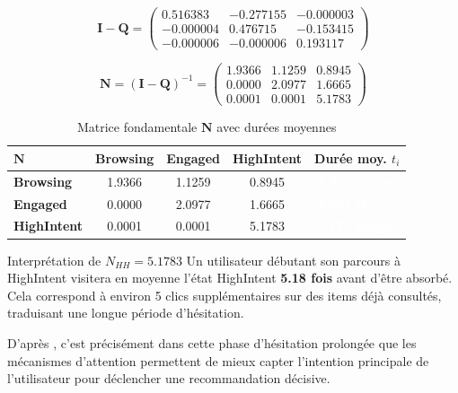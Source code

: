 \documentclass[11pt,a4paper]{article}
\newcommand{\mat}[1]{\mathbf{#1}}
\newcommand{\st}[1]{\textsf{\small#1}}
\begin{document}
\[
  \mat{I}-\mat{Q} =
  \begin{pmatrix}
    0.516383 & -0.277155 & -0.000003 \\
   -0.000004 &  0.476715 & -0.153415 \\
   -0.000006 & -0.000006 &  0.193117
  \end{pmatrix}
\]

\[
  \boxed{
    \mat{N} = (\mat{I}-\mat{Q})^{-1} =
    \begin{pmatrix}
      1.9366 & 1.1259 & 0.8945 \\
      0.0000 & 2.0977 & 1.6665 \\
      0.0001 & 0.0001 & 5.1783
    \end{pmatrix}
  }
\]

\begin{table}[H]
\centering
\caption{Matrice fondamentale $\mat{N}$ avec durées moyennes}
\label{tab:N}
\begin{tabular}{l|ccc|c}
\toprule
\rowcolor{DarkBlue}
\color{white}$\mat{N}$ &
\color{white}Browsing &
\color{white}Engaged &
\color{white}HighIntent &
\color{white}\textbf{Durée moy. $t_i$} \\
\midrule
\rowcolor{LightBlue}
\textbf{Browsing} &
  1.9366 & 1.1259 & 0.8945 &
  \cellcolor{DarkBlue}\textcolor{white}{\bfseries 3.957 étapes} \\
\rowcolor{LightGreen}
\textbf{Engaged} &
  0.0000 & 2.0977 & 1.6665 &
  \cellcolor{DarkBlue}\textcolor{white}{\bfseries 3.764 étapes} \\
\rowcolor{LightOrange}
\textbf{HighIntent} &
  0.0001 & 0.0001 & 5.1783 &
  \cellcolor{DarkOrange!70}\textcolor{white}{\bfseries 5.178 étapes} \\
\bottomrule
\end{tabular}
\end{table}

\begin{exbox}{Interprétation de $N_{HH} = 5.1783$}
Un utilisateur débutant son parcours à \st{HighIntent} visitera en moyenne
l'état \st{HighIntent} \textbf{5.18 fois} avant d'être absorbé. Cela
correspond à environ 5 clics supplémentaires sur des items déjà
consultés, traduisant une longue période d'hésitation.

D'après \citet{li2017narm}, c'est précisément dans cette phase
d'hésitation prolongée que les mécanismes d'attention permettent
de mieux capter l'intention principale de l'utilisateur pour
déclencher une recommandation décisive.
\end{exbox}
\end{document}
